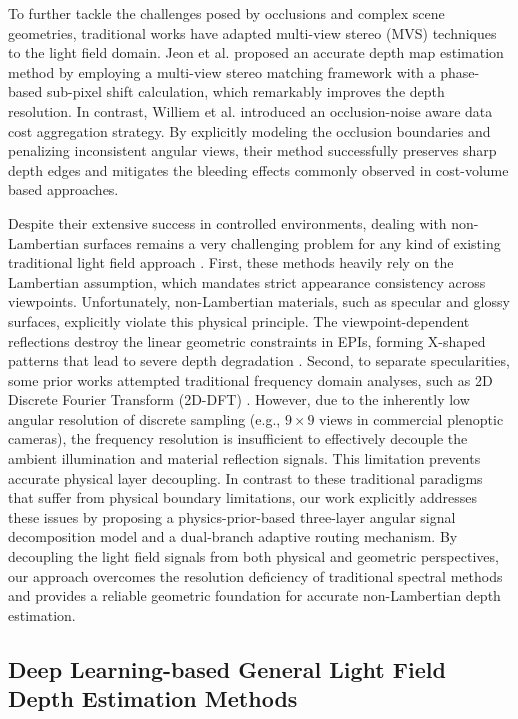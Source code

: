 \documentclass[lettersize,journal]{IEEEtran}
\begin{document}
To further tackle the challenges posed by occlusions and complex scene geometries, traditional works have adapted multi-view stereo (MVS) techniques to the light field domain. Jeon et al. \cite{JeonMVSlenslet} proposed an accurate depth map estimation method by employing a multi-view stereo matching framework with a phase-based sub-pixel shift calculation, which remarkably improves the depth resolution. In contrast, Williem et al. \cite{Williemocclusionnoise} introduced an occlusion-noise aware data cost aggregation strategy. By explicitly modeling the occlusion boundaries and penalizing inconsistent angular views, their method successfully preserves sharp depth edges and mitigates the bleeding effects commonly observed in cost-volume based approaches.

Despite their extensive success in controlled environments, dealing with non-Lambertian surfaces remains a very challenging problem for any kind of existing traditional light field approach \cite{nonLambertiansurfacesspecul}. First, these methods heavily rely on the Lambertian assumption, which mandates strict appearance consistency across viewpoints. Unfortunately, non-Lambertian materials, such as specular and glossy surfaces, explicitly violate this physical principle. The viewpoint-dependent reflections destroy the linear geometric constraints in EPIs, forming X-shaped patterns that lead to severe depth degradation \cite{Xshapedpatternsgeometricco}. Second, to separate specularities, some prior works attempted traditional frequency domain analyses, such as 2D Discrete Fourier Transform (2D-DFT) \cite{2DDFTfrequencydomain}. However, due to the inherently low angular resolution of discrete sampling (e.g., $9 \times 9$ views in commercial plenoptic cameras), the frequency resolution is insufficient to effectively decouple the ambient illumination and material reflection signals. This limitation prevents accurate physical layer decoupling. In contrast to these traditional paradigms that suffer from physical boundary limitations, our work explicitly addresses these issues by proposing a physics-prior-based three-layer angular signal decomposition model and a dual-branch adaptive routing mechanism. By decoupling the light field signals from both physical and geometric perspectives, our approach overcomes the resolution deficiency of traditional spectral methods and provides a reliable geometric foundation for accurate non-Lambertian depth estimation.

\subsection{Deep Learning-based General Light Field Depth Estimation Methods}
\end{document}
